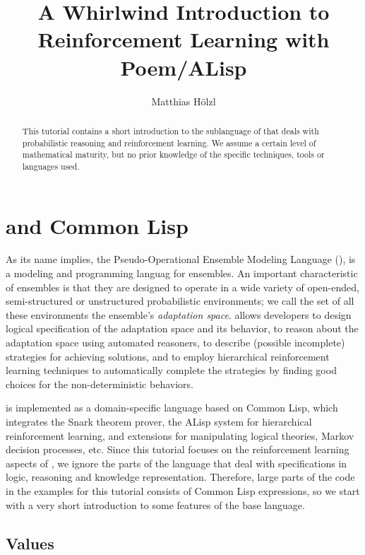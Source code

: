 \documentclass[a4paper]{amsart}
\begin{document}
\title{A Whirlwind Introduction to Reinforcement Learning with
  Poem/ALisp} 

\author{Matthias H\"olzl}

\maketitle

\begin{abstract}
  This tutorial contains a short introduction to the sublanguage of
  \Poem{} that deals with probabilistic reasoning and reinforcement
  learning.  We assume a certain level of mathematical maturity, but
  no prior knowledge of the specific techniques, tools or languages
  used.
\end{abstract}

\section{\Poem{} and Common Lisp}
\label{sec:lisp}

As its name implies, the Pseudo-Operational Ensemble Modeling Language
(\Poem), is a modeling and programming languag for ensembles.  An
important characteristic of ensembles is that they are designed to
operate in a wide variety of open-ended, semi-structured or
unstructured probabilistic environments; we call the set of all these
environments the ensemble's \emph{adaptation space}. \Poem{} allows
developers to design logical specification of the adaptation space and
its behavior, to reason about the adaptation space using automated
reasoners, to describe (possible incomplete) strategies for achieving
solutions, and to employ hierarchical reinforcement learning
techniques to automatically complete the strategies by finding good
choices for the non-deterministic behaviors.

\Poem{} is implemented as a domain-specific language based on Common
Lisp, which integrates the Snark theorem prover, the ALisp system for
hierarchical reinforcement learning, and extensions for manipulating
logical theories, Markov decision processes, etc.  Since this tutorial
focuses on the reinforcement learning aspects of \Poem, we ignore the
parts of the language that deal with specifications in logic,
reasoning and knowledge representation.  Therefore, large parts of the
code in the examples for this tutorial consists of Common Lisp
expressions, so we start with a very short introduction to some
features of the base language.

\subsection{Values}
\label{sec:values}
\end{document}
